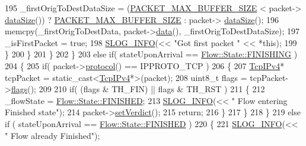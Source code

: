 \begin{DoxyCode}
195                     \_firstOrigToDestDataSize = (\hyperlink{_flow_8h_a3850e13d81280c9383e0b2a20eaebaeb}{PACKET\_MAX\_BUFFER\_SIZE} < packet->
      \hyperlink{class_vsid_common_1_1_i_pv4_packet_a39fe36210895625ee87320f5c0c7f52e}{dataSize}()) ? \hyperlink{_flow_8h_a3850e13d81280c9383e0b2a20eaebaeb}{PACKET\_MAX\_BUFFER\_SIZE} : packet->
      \hyperlink{class_vsid_common_1_1_i_pv4_packet_a39fe36210895625ee87320f5c0c7f52e}{dataSize}();
196                     memcpy(\_firstOrigToDestData, packet->\hyperlink{class_vsid_common_1_1_i_pv4_packet_a9fb8c763d740e193a68c55604a8a7bd6}{data}(), \_firstOrigToDestDataSize);
197                     \_isFirstPacket = \textcolor{keyword}{true};
198                     \hyperlink{_logger_8h_a119c1c29ba35a8db38e2358e41167282}{SLOG\_INFO}(<< \textcolor{stringliteral}{"Got first packet "} << *\textcolor{keyword}{this});
199                 \}
200             \}
201         \}
202     \}
203     \textcolor{keywordflow}{else} \textcolor{keywordflow}{if}( stateUponArrival == \hyperlink{class_vsid_common_1_1_flow_a4c78d7517903031a861c7287e706a6c2a7a36ce282aeac424b9187eb19cf635c0}{Flow::State::FINISHING} )
204     \{
205         \textcolor{keywordflow}{if}( packet->\hyperlink{class_vsid_common_1_1_i_pv4_packet_ac1ff979633726d9f558bce1210595879}{protocol}() == IPPROTO\_TCP )
206         \{
207             \hyperlink{class_vsid_common_1_1_tcp_i_pv4}{TcpIPv4}* tcpPacket = \textcolor{keyword}{static\_cast<}\hyperlink{class_vsid_common_1_1_tcp_i_pv4}{TcpIPv4}*\textcolor{keyword}{>}(packet);
208             uint8\_t flags = tcpPacket->\hyperlink{class_vsid_common_1_1_tcp_i_pv4_adb5c52a0772cf3bd53c41702b877b7d1}{flags}();
209 
210             \textcolor{keywordflow}{if}( (flags & TH\_FIN) || flags & TH\_RST )
211             \{
212                 \_flowState = \hyperlink{class_vsid_common_1_1_flow_a4c78d7517903031a861c7287e706a6c2a2c616b2713e2e0aed04b4c4752c88133}{Flow::State::FINISHED};
213                 \hyperlink{_logger_8h_a119c1c29ba35a8db38e2358e41167282}{SLOG\_INFO}(<< \textcolor{stringliteral}{" Flow entering Finished state"});
214                 packet->\hyperlink{class_vsid_common_1_1_i_pv4_packet_ae314f9e085588928d3c260211f80da87}{setVerdict}();
215                 \textcolor{keywordflow}{return};
216             \}
217         \}
218     \}
219     \textcolor{keywordflow}{else} \textcolor{keywordflow}{if} ( stateUponArrival == \hyperlink{class_vsid_common_1_1_flow_a4c78d7517903031a861c7287e706a6c2a2c616b2713e2e0aed04b4c4752c88133}{Flow::State::FINISHED} )
220     \{
221         \hyperlink{_logger_8h_a119c1c29ba35a8db38e2358e41167282}{SLOG\_INFO}(<< \textcolor{stringliteral}{" Flow already Finished"});

\end{DoxyCode}
